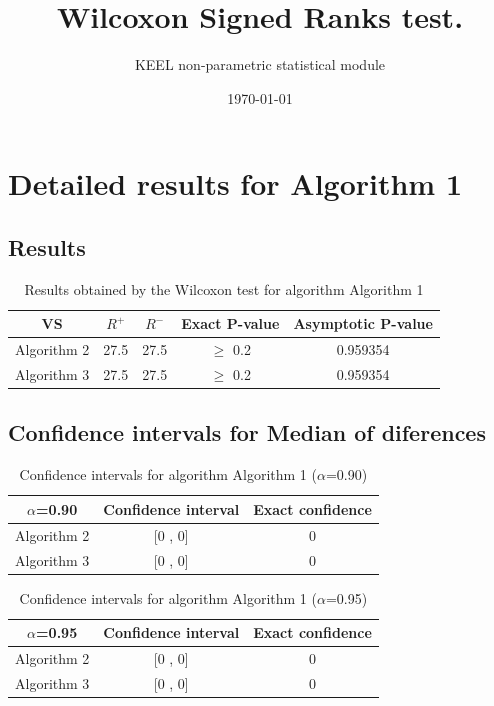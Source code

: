 \documentclass[a4paper,10pt]{article}
\title{Wilcoxon Signed Ranks test.}
\date{\today}
\author{KEEL non-parametric statistical module}
\begin{document}
\pagestyle{empty}
\maketitle
\thispagestyle{empty}



\section{Detailed results for Algorithm 1}


\subsection{Results}

\begin{table}[!htp]
\centering\small
\begin{tabular}{
|c|c|c|c|c|}
\hline
 VS & $R^{+}$ & $R^{-}$ & Exact P-value & Asymptotic P-value \\ \hline 
Algorithm 2 & 27.5 & 27.5 & $\geq$ 0.2 & 0.959354\\ \hline 
Algorithm 3 & 27.5 & 27.5 & $\geq$ 0.2 & 0.959354\\ \hline 

\end{tabular}
\caption{Results obtained by the Wilcoxon test for algorithm Algorithm 1}
\end{table}

\subsection{Confidence intervals for Median of diferences}

\begin{table}[!htp]
\centering\small
\begin{tabular}{
|c|c|c|}
\hline
 $\alpha$=0.90 & Confidence interval & Exact confidence \\ \hline 
Algorithm 2 & [0 , 0] & 0\\ \hline 
Algorithm 3 & [0 , 0] & 0\\ \hline 

\end{tabular}
\caption{Confidence intervals for algorithm Algorithm 1 ($\alpha$=0.90)}
\end{table}
\begin{table}[!htp]
\centering\small
\begin{tabular}{
|c|c|c|}
\hline
 $\alpha$=0.95 & Confidence interval & Exact confidence \\ \hline 
Algorithm 2 & [0 , 0] & 0\\ \hline 
Algorithm 3 & [0 , 0] & 0\\ \hline 

\end{tabular}
\caption{Confidence intervals for algorithm Algorithm 1 ($\alpha$=0.95)}
\end{table}
\end{document}
